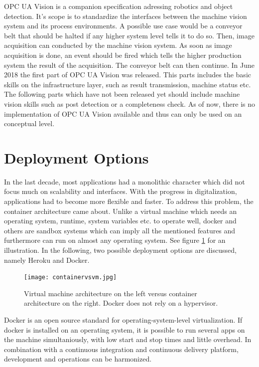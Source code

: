 OPC UA Vision is a companion specification adressing robotics and object detection. \cite{VDMA2018OPCSpecification} It's scope is to standardize the interfaces between the machine vision system and its process environments. A possible use case would be a conveyor belt that should be halted if any higher system level tells it to do so. Then, image acquisition can conducted by the machine vision system. As soon as image acquisition is done, an event should be fired which tells the higher production system the result of the acquisition. The conveyor belt can then continue. In June 2018 the first part of OPC UA Vision was released. This parts includes the basic skills on the infrastructure layer, such as result transmission, machine status etc. The following parts which have not been released yet should include machine vision skills such as post detection or a completeness check. As of now, there is no implementation of OPC UA Vision available and thus can only be used on an conceptual level.

\section {Deployment Options}
\label{deploymentoptions}
In the last decade, most applications had a monolithic character which did not focus much on scalability and interfaces. With the progress in digitalization, applications had to become more flexible and faster. To address this problem, the container architecture came about. Unlike a virtual machine which needs an operating system, runtime, system variables etc. to operate well, docker and others are sandbox systems which can imply all the mentioned features and furthermore can run on almost any operating system. See figure \ref{container} for an illustration. In the following, two possible deployment options are discussed, namely Heroku and Docker.\cite{WurbsLastvisited2018-11-272017DockerVeraendern}

\begin{figure}[ht]
	\centering
  \texttt{[image: containervsvm.jpg]}
	\caption[Docker vs Virtual Machine Architecture]{Virtual machine architecture on the left versus container architecture on the right. Docker does not rely on a hypervisor.\cite{WurbsLastvisited2018-11-272017DockerVeraendern}}
	\label{container}
\end{figure}

Docker is an open source standard for operating-system-level virtualization. If docker is installed on an operating system, it is possible to run several apps on the machine simultaniously, with low start and stop times and little overhead. In combination with a continuous integration and continuous delivery platform, development and operations can be harmonized.

